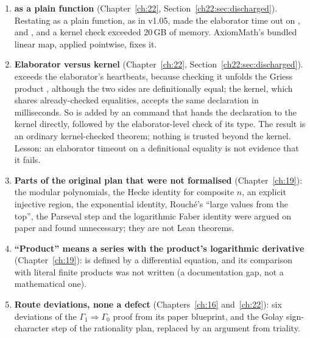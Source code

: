 \begin{enumerate}
  , , and the bundled map
   applied pointwise); then every layer is definitionally AxiomMath's. Seven proofs
  needed small rewrites; no statement changed. Lesson: ``identical up to renaming'' must be checked on the Lean terms,
  by a kernel probe, not on the source text.
\item \textbf{ as a plain function} (Chapter~\ref{ch:22}, Section~\ref{ch22:sec:discharged}). Restating
   as a plain function, as in v1.05, made the elaborator time out on ,  and , and
  a kernel check exceeded $20$\,GB of memory. AxiomMath's bundled linear map, applied pointwise, fixes
  it.
\item \textbf{Elaborator versus kernel} (Chapter~\ref{ch:22}, Section~\ref{ch22:sec:discharged}).
   exceeds the elaborator's heartbeats, because checking it unfolds the Griess
  product , although the two sides are definitionally equal; the kernel, which shares already-checked
  equalities, accepts the same declaration in milliseconds. So  is added by an  command
  that hands the declaration to the kernel directly, followed by the elaborator-level check
   of its type. The result is an ordinary kernel-checked theorem; nothing is
  trusted beyond the kernel. Lesson: an elaborator timeout on a definitional equality is not evidence that it fails.
\item \textbf{Parts of the original plan that were not formalised} (Chapter~\ref{ch:19}): the modular polynomials, the
  Hecke identity for composite $n$, an explicit injective region, the exponential identity, Rouch\'e's ``large values from
  the top'', the Parseval step and the logarithmic Faber identity were argued on paper and found unnecessary; they are not
  Lean theorems.
\item \textbf{``Product'' means a series with the product's logarithmic derivative} (Chapter~\ref{ch:19}): 
  is defined by a differential equation, and its comparison with literal finite products was not written (a documentation
  gap, not a mathematical one).
\item \textbf{Route deviations, none a defect} (Chapters~\ref{ch:16} and~\ref{ch:22}): six deviations of the
  $\Gamma_1\Rightarrow\Gamma_0$ proof from its paper blueprint, and the Golay sign-character step of the rationality plan,
  replaced by an argument from triality.
\end{enumerate}

